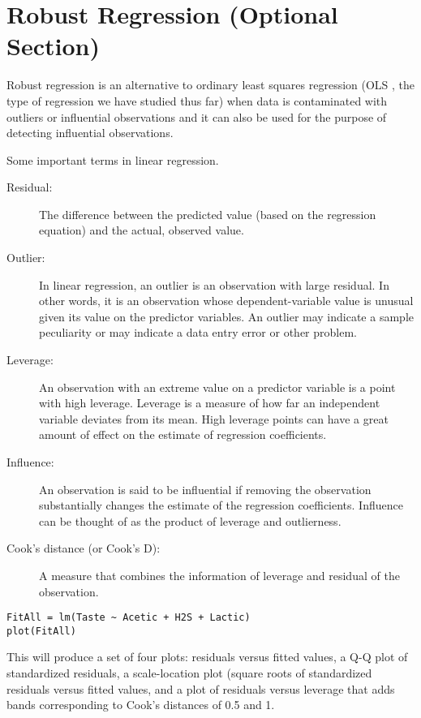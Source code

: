 \documentclass[main.tex]{subfiles}
\begin{document}
\newpage
\section{Robust Regression (Optional Section)}

Robust regression is an alternative to ordinary least squares regression (OLS , the type of regression we have studied thus far) when data is contaminated with outliers or influential observations and it can also be used for the purpose of detecting influential observations.

Some important terms in linear regression.
\begin{description}
\item[Residual: ] The difference between the predicted value (based on the regression equation) and the actual, observed value.
\item[Outlier:]  In linear regression, an outlier is an observation with large residual.  In other words, it is an observation whose dependent-variable value is unusual given its value on the predictor variables.  An outlier may indicate a sample peculiarity or may indicate a data entry error or other problem. 
\item[Leverage:]  An observation with an extreme value on a predictor variable is a point with high leverage.  Leverage is a measure of how far an independent variable deviates from its mean.  High leverage points can have a great amount of effect on the estimate of regression coefficients. 
\item[Influence:]  An observation is said to be influential if removing the observation substantially changes the estimate of the regression coefficients.  Influence can be thought of as the product of leverage and outlierness.  
\item[Cook's distance (or Cook's D):] A measure that combines the information of leverage and residual of the observation.  
\end{description}

\begin{framed}
\begin{verbatim}
FitAll = lm(Taste ~ Acetic + H2S + Lactic)
plot(FitAll)
\end{verbatim}
\end{framed}
This will produce a set of four plots: residuals versus fitted values, a Q-Q plot of standardized residuals, a scale-location plot (square roots of standardized residuals versus fitted values, and a plot of residuals versus leverage that adds bands corresponding to Cook's distances of 0.5 and 1. 
\end{document}
